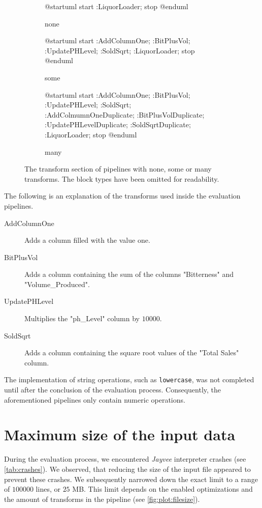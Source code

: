 \begin{figure}
	\begin{subfigure}[h]{0.3\linewidth}
		\begin{plantuml}
			@startuml
			start
			:LiquorLoader;
			stop
			@enduml
		\end{plantuml}
		\caption{none}
	\end{subfigure}
	\hfill
	\begin{subfigure}[h]{0.3\linewidth}
		\begin{plantuml}
			@startuml
			start
			:AddColumnOne;
			:BitPlusVol;
			:UpdatePHLevel;
			:SoldSqrt;
			:LiquorLoader;
			stop
			@enduml
		\end{plantuml}
		\caption{some}
	\end{subfigure}
	\hfill
	\begin{subfigure}[h]{0.3\linewidth}
		\begin{plantuml}
			@startuml
			start
			:AddColumnOne;
			:BitPlusVol;
			:UpdatePHLevel;
			:SoldSqrt;
			:AddColmumnOneDuplicate;
			:BitPlusVolDuplicate;
			:UpdatePHLevelDuplicate;
			:SoldSqrtDuplicate;
			:LiquorLoader;
			stop
			@enduml
		\end{plantuml}
		\caption{many}
	\end{subfigure}
	\caption{The transform section of pipelines with none, some or many transforms.
		The block types have been omitted for readability.}
	\label{fig:uml:pipelines:transforms}
\end{figure}

The following is an explanation of the transforms used inside the evaluation pipelines.
\begin{description}
	\item[AddColumnOne] Adds a column filled with the value one.
	\item[BitPlusVol] Adds a column containing the sum of the columns "Bitterness" and "Volume\_Produced".
	\item[UpdatePHLevel] Multiplies the "ph\_Level" column by $10 000$.
	\item[SoldSqrt] Adds a column containing the square root values of the "Total Sales" column.
\end{description}

The implementation of string operations, such as \Verb|lowercase|, was not completed until after the conclusion of the evaluation process.
Consequently, the aforementioned pipelines only contain numeric operations.

\section{Maximum size of the input data}
\label{eval:max_size}
During the evaluation process, we encountered \emph{Jayvee} interpreter crashes (see \autoref{tab:crashes}).
We observed, that reducing the size of the input file appeared to prevent these crashes.
We subsequently narrowed down the exact limit to a range of $100 000$ lines, or $25$ \ac{MB}.
This limit depends on the enabled optimizations and the amount of transforms in the pipeline (see \autoref{fig:plot:filesize}).


